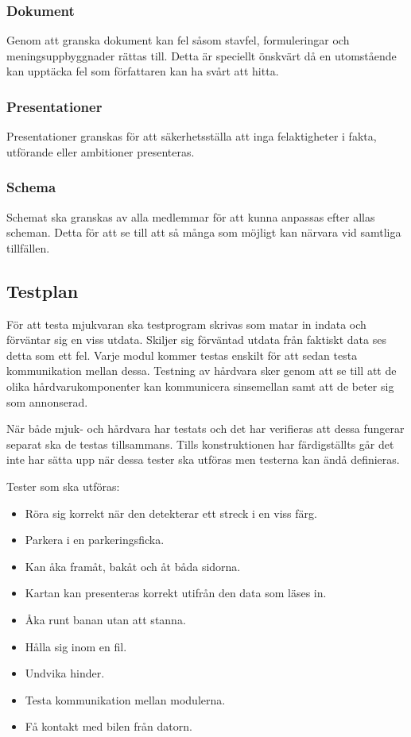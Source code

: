 \documentclass[projektplan/plan.tex]{subfiles}
\begin{document}
\subsubsection{Dokument}	
Genom att granska dokument kan fel såsom stavfel, formuleringar och
meningsuppbyggnader rättas till. Detta är speciellt önskvärt då en utomstående
kan upptäcka fel som författaren kan ha svårt att hitta.

\subsubsection{Presentationer}	
Presentationer granskas för att säkerhetsställa att inga felaktigheter i fakta,
utförande eller ambitioner presenteras.

\subsubsection{Schema}	
Schemat ska granskas av alla medlemmar för att kunna anpassas efter allas
scheman. Detta för att se till att så många som möjligt kan närvara vid
samtliga tillfällen. 

\subsection{Testplan}
För att testa mjukvaran ska testprogram skrivas som matar in indata och
förväntar sig en viss utdata. Skiljer sig förväntad utdata från faktiskt data
ses detta som ett fel. Varje modul kommer testas enskilt för att sedan testa
kommunikation mellan dessa. Testning av hårdvara sker genom att se till att de
olika hårdvarukomponenter kan kommunicera sinsemellan samt att de beter sig som
annonserad.

När både mjuk- och hårdvara har testats och det har verifieras att dessa
fungerar separat ska de testas tillsammans. Tills konstruktionen har
färdigställts går det inte har sätta upp när dessa tester ska utföras men
testerna kan ändå definieras.

\vspace{5mm}
\noindent
Tester som ska utföras:
\begin{itemize}
    \item Röra sig korrekt när den detekterar ett streck i en viss färg.
    \item Parkera i en parkeringsficka.
    \item Kan åka framåt, bakåt och åt båda sidorna.
    \item Kartan kan presenteras korrekt utifrån den data som läses in.
    \item Åka runt banan utan att stanna.
    \item Hålla sig inom en fil.
    \item Undvika hinder.
    \item Testa kommunikation mellan modulerna.
    \item Få kontakt med bilen från datorn.
\end{itemize}

\end{document}
